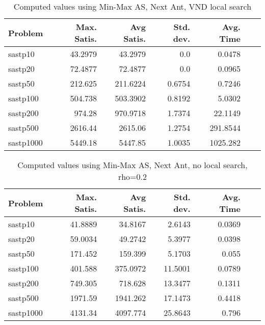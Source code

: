 \documentclass{article}
\begin{document}
\begin{table}[b!]
  \caption{Computed values using Min-Max AS, Next Ant, VND local search}
  \label{tab:conf6}
  \setlength{\tabcolsep}{1.4mm}
  \centering
  \begin{tabular}{lrrrrrr}
    \bfseries Problem &
    \bfseries Max. Satis. &
    \bfseries Avg Satis. &
    \bfseries Std. dev. &
    \bfseries Avg. Time 
    \\\hline
    sastp10 & 43.2979 & 43.2979 & 0.0 & 0.0478 \\ 
    sastp20 & 72.4877 & 72.4877 & 0.0 & 0.0965 \\ 
    sastp50 & 212.625 & 211.6224 & 0.6754 & 0.7246 \\ 
    sastp100 & 504.738 & 503.3902 & 0.8192 & 5.0302 \\ 
    sastp200 & 974.28 & 970.9718 & 1.7374 & 22.1149 \\ 
    sastp500 & 2616.44 & 2615.06 & 1.2754 & 291.8544 \\ 
    sastp1000 & 5449.18 & 5447.85 & 1.0035 & 1025.282
    \\\hline
  \end{tabular}

\end{table}

\begin{table}[b!]
  \caption{Computed values using Min-Max AS, Next Ant, no local search, rho=0.2}
  \label{tab:conf7}
  \setlength{\tabcolsep}{1.4mm}
  \centering
  \begin{tabular}{lrrrrrr}
    \bfseries Problem &
    \bfseries Max. Satis. &
    \bfseries Avg Satis. &
    \bfseries Std. dev. &
    \bfseries Avg. Time 
    \\\hline
   sastp10 & 41.8889 & 34.8167 & 2.6143 & 0.0369 \\ 
   sastp20 & 59.0034 & 49.2742 & 5.3977 & 0.0398 \\ 
   sastp50 & 171.452 & 159.399 & 5.1703 & 0.055 \\ 
   sastp100 & 401.588 & 375.0972 & 11.5001 & 0.0789 \\ 
   sastp200 & 749.305 & 718.628 & 13.3477 & 0.1311 \\ 
   sastp500 & 1971.59 & 1941.262 & 17.1473 & 0.4418 \\ 
   sastp1000 & 4131.34 & 4097.774 & 25.8643 & 0.796

    \\\hline
  \end{tabular}

\end{table}
\end{document}
